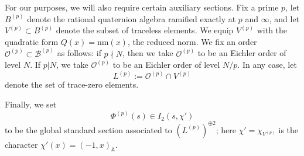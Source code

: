 \documentclass[reqno,oneside]{amsart}
\theoremstyle{plain}
\theoremstyle{remark}
\numberwithin{theorem}{section}
\newcommand{\bbA}{\mathbb A}
\newcommand{\calB}{\mathcal B}
\newcommand{\calO}{\mathcal O}
\begin{document}
	
	For our purposes, we will also require certain auxiliary sections. Fix a prime $p$, let $B^{(p)}$ denote the rational quaternion algebra ramified exactly at $p$ and $\infty$, and let $V^{(p)} \subset B^{(p)}$ denote the subset of traceless elements. We equip $V^{(p)}$ with the quadratic form $Q(x) = \mathrm{nm}(x)$, the reduced norm. We fix an order $\calO^{(p)} \subset \calB^{(p)}$ as follows: if $p \nmid N$, then we take $\calO^{(p)}$ to be an Eichler order of level $N$. If $p | N$, we take $\calO^{(p)}$ to be an Eichler order of level $N/p$. In any case, let
	\begin{equation} \label{eqn:Lp lattice def}
	L^{(p)} := \calO^{(p)} \cap V^{(p)}
	\end{equation}
	denote the set of trace-zero elements.
	
	Finally, we set
	\begin{equation} \label{eq:Neighbor}
	\Phi^{(p)}(s) \in I_2(s,\chi')
	\end{equation}
	to be the global standard section associated to  $(L^{(p)})^{\oplus 2}$; here $\chi' = \chi_{V^{(p)}}$ is the character $\chi'(x) = (-1, x)_{\bbA}$.
	
\end{document}
